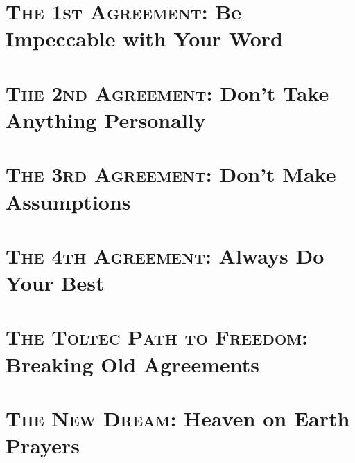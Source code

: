 \documentclass[oneside]{book}
\numberwithin{equation}{section}
\begin{document}
\section{\textsc{The 1st Agreement}: Be Impeccable with Your Word}

\section{\textsc{The 2nd Agreement}: Don't Take Anything Personally}

\section{\textsc{The 3rd Agreement}: Don't Make Assumptions}

\section{\textsc{The 4th Agreement}: Always Do Your Best}

\section{\textsc{The Toltec Path to Freedom}: Breaking Old Agreements}

\section{\textsc{The New Dream}: Heaven on Earth Prayers}




\printbibliography[heading=bibintoc]
	
\end{document}
